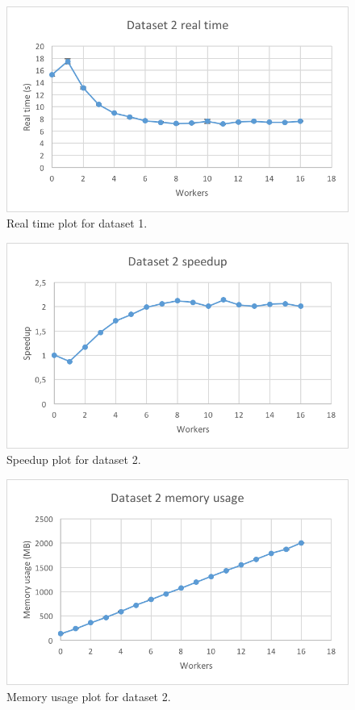 \begin{figure}[ht]
  \centering
  \includegraphics[width=120mm]{figures/dataset_2/dataset_2_real_time.png}
  \caption[Real time plot for dataset 1.]{Real time plot for dataset 1.}
  \label{fig:dataset_2_real_time}
\end{figure}

\begin{figure}[ht]
  \centering
  \includegraphics[width=120mm]{figures/dataset_2/dataset_2_speedup.png}
  \caption[Speedup plot for dataset 2.]{Speedup plot for dataset 2.}
  \label{fig:dataset_2_speedup}
\end{figure}

\begin{figure}[ht]
  \centering
  \includegraphics[width=120mm]{figures/dataset_2/dataset_2_memory.png}
  \caption[Memory usage plot for dataset 2.]{Memory usage plot for dataset 2.}
  \label{fig:dataset_2_memory}
\end{figure}

